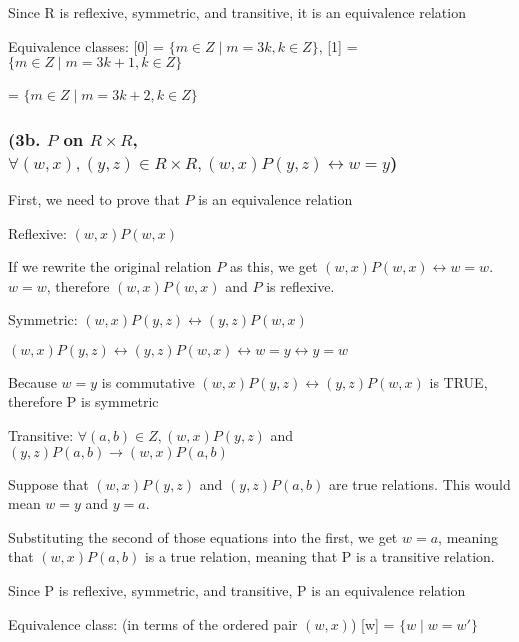 \documentclass{article}
\begin{document}
\noindent Since R is reflexive, symmetric, and transitive, it is an equivalence relation \par\vspace{0.5cm}
\noindent Equivalence classes: [0] = $\{m \in Z \mid m = 3k, k \in Z\}$, [1] = $\{m \in Z \mid m = 3k + 1, k \in Z \}$ \par\noindent [2] = $\{m \in Z \mid m = 3k + 2, k \in Z\}$

\subsubsection{(3b. $P$ on $R \times R$, $\forall (w, x), (y, z) \in R \times R, (w, x) P (y, z) \leftrightarrow w = y$)}

\noindent First, we need to prove that $P$ is an equivalence relation \par\vspace{0.5cm}

\noindent Reflexive: $(w, x)P(w, x)$ \par\noindent
If we rewrite the original relation $P$ as this, we get $(w, x)P(w, x) \leftrightarrow w = w$.  $w = w$, therefore $(w, x)P(w, x)$ and $P$ is reflexive. \par\vspace{0.5cm}

\noindent Symmetric: $(w, x)P(y, z) \leftrightarrow (y, z)P(w, x)$ \par\noindent
$(w, x)P(y, z) \leftrightarrow (y, z)P(w, x) \leftrightarrow w = y \leftrightarrow y = w$ \par\noindent Because $w = y$ is commutative $(w, x)P(y, z) \leftrightarrow (y, z)P(w, x)$ is TRUE, therefore P is symmetric \par\vspace{0.5cm}

\noindent Transitive: $\forall (a, b) \in Z, (w, x)P(y, z)$ and $(y, z)P(a, b) \rightarrow (w, x)P(a, b)$ \par\noindent Suppose that $(w, x)P(y, z)$ and $(y, z)P(a, b)$ are true relations.  This would mean $w = y$ and $y = a$. \par\noindent
Substituting the second of those equations into the first, we get $w = a$, meaning that $(w, x)P(a, b)$ is a true relation, meaning that P is a transitive relation. \par\vspace{0.5cm}

\noindent Since P is reflexive, symmetric, and transitive, P is an equivalence relation \par\vspace{0.5cm}

\noindent Equivalence class: (in terms of the ordered pair $(w, x)$) [w] = $\{w \mid w = w'\}$
\end{document}
